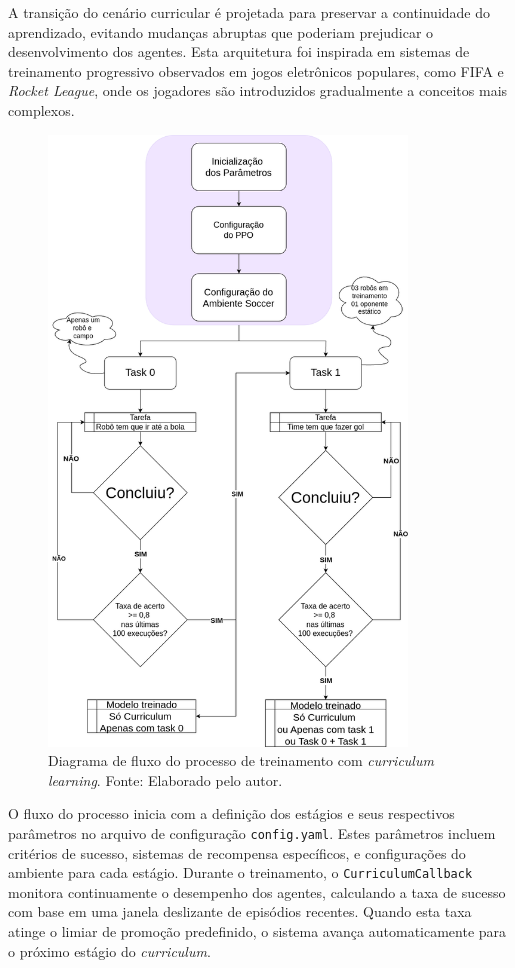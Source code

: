 A transição do cenário curricular é projetada para preservar a continuidade do aprendizado, evitando mudanças abruptas que poderiam prejudicar o desenvolvimento dos agentes. Esta arquitetura foi inspirada em sistemas de treinamento progressivo observados em jogos eletrônicos populares, como FIFA e \textit{Rocket League}, onde os jogadores são introduzidos gradualmente a conceitos mais complexos.

\begin{figure}[H]
    \centering
    \includegraphics[width=0.85\textwidth]{fig/fluxograma_treino_curriculum.png}
    \caption{Diagrama de fluxo do processo de treinamento com \textit{curriculum learning}. Fonte: Elaborado pelo autor.}
    \label{fig:diagrama_curriculum}
\end{figure}

O fluxo do processo inicia com a definição dos estágios e seus respectivos parâmetros no arquivo de configuração \texttt{config.yaml}. Estes parâmetros incluem critérios de sucesso, sistemas de recompensa específicos, e configurações do ambiente para cada estágio. Durante o treinamento, o \texttt{CurriculumCallback} monitora continuamente o desempenho dos agentes, calculando a taxa de sucesso com base em uma janela deslizante de episódios recentes. Quando esta taxa atinge o limiar de promoção predefinido, o sistema avança automaticamente para o próximo estágio do \textit{curriculum}.

